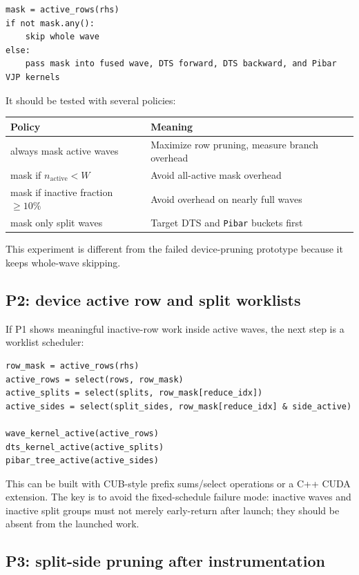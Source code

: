\documentclass[11pt]{article}
\newcommand{\code}[1]{\texttt{#1}}
\begin{document}
\begin{lstlisting}
mask = active_rows(rhs)
if not mask.any():
    skip whole wave
else:
    pass mask into fused wave, DTS forward, DTS backward, and Pibar VJP kernels
\end{lstlisting}

It should be tested with several policies:

\begin{center}
\begin{tabular}{ll}
\toprule
Policy & Meaning \\
\midrule
always mask active waves & Maximize row pruning, measure branch overhead \\
mask if \(n_{\mathrm{active}} < W\) & Avoid all-active mask overhead \\
mask if inactive fraction \(\ge 10\%\) & Avoid overhead on nearly full waves \\
mask only split waves & Target DTS and \code{Pibar} buckets first \\
\bottomrule
\end{tabular}
\end{center}

This experiment is different from the failed device-pruning prototype because
it keeps whole-wave skipping.

\subsection{P2: device active row and split worklists}

If P1 shows meaningful inactive-row work inside active waves, the next step is
a worklist scheduler:

\begin{lstlisting}
row_mask = active_rows(rhs)
active_rows = select(rows, row_mask)
active_splits = select(splits, row_mask[reduce_idx])
active_sides = select(split_sides, row_mask[reduce_idx] & side_active)

wave_kernel_active(active_rows)
dts_kernel_active(active_splits)
pibar_tree_active(active_sides)
\end{lstlisting}

This can be built with CUB-style prefix sums/select operations or a C++ CUDA
extension.  The key is to avoid the fixed-schedule failure mode: inactive waves
and inactive split groups must not merely early-return after launch; they
should be absent from the launched work.

\subsection{P3: split-side pruning after instrumentation}
\end{document}
